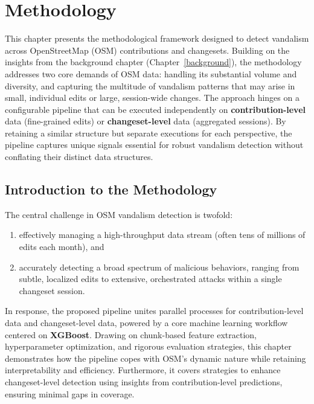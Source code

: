 \documentclass[
    13pt, %
    a4paper, %
    listof=totoc, %
    bibliography=totoc, %
    index=totoc, %
    headsepline
]{scrreprt}
\begin{document}
\chapter{Methodology}
\label{chap:methods}

\noindent
This chapter presents the methodological framework designed to detect vandalism across OpenStreetMap (OSM) contributions and changesets. Building on the insights from the background chapter (Chapter~\ref{background}), the methodology addresses two core demands of OSM data: handling its substantial volume and diversity, and capturing the multitude of vandalism patterns that may arise in small, individual edits or large, session-wide changes. The approach hinges on a configurable pipeline that can be executed independently on \textbf{contribution-level} data (fine-grained edits) or \textbf{changeset-level} data (aggregated sessions). By retaining a similar structure but separate executions for each perspective, the pipeline captures unique signals essential for robust vandalism detection without conflating their distinct data structures.

\section{Introduction to the Methodology}
\label{sec:introduction_methods}

The central challenge in OSM vandalism detection is twofold: 
\begin{enumerate}[label=(\arabic*)]
    \item effectively managing a high-throughput data stream (often tens of millions of edits each month), and 
    \item accurately detecting a broad spectrum of malicious behaviors, ranging from subtle, localized edits to extensive, orchestrated attacks within a single changeset session.
\end{enumerate}

In response, the proposed pipeline unites parallel processes for contribution-level data and changeset-level data, powered by a core machine learning workflow centered on \textbf{XGBoost}. Drawing on chunk-based feature extraction, hyperparameter optimization, and rigorous evaluation strategies, this chapter demonstrates how the pipeline copes with OSM’s dynamic nature while retaining interpretability and efficiency. Furthermore, it covers strategies to enhance changeset-level detection using insights from contribution-level predictions, ensuring minimal gaps in coverage.
\end{document}
